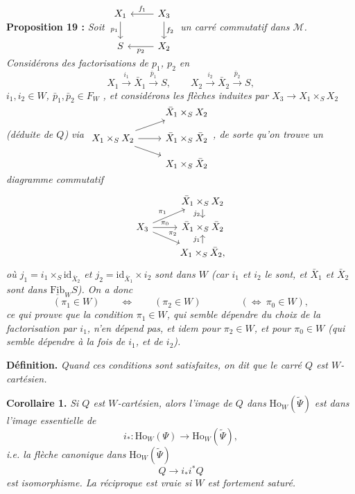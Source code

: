 \documentclass[11pt]{article}
\newcommand{\printedpage}[1]{\marginpar{\footnotesize p.~#1}}
\newcommand{\msp}[1]{\marginpar{\footnotesize [#1]}}
\newcommand{\Ho}{\mathrm{Ho}}
\begin{document}
\textbf{Proposition 19 :} \textit{Soit $\begin{tikzcd}[ampersand replacement=\&] X_1 \arrow[d, "p_1"'] \& X_3 \arrow[l, "f_1"'] \arrow[d, "f_2"] \\ S \& X_2 \arrow[l, "p_2"] \end{tikzcd}$ un carré commutatif dans $\mathcal{M}$. Considérons des factorisations de $p_1$, $p_2$ en}
\[
X_1\xrightarrow{\ i_1\ }\bar{X}_1\xrightarrow{\ \bar{p}_1\ }S,\qquad X_2\xrightarrow{\ i_2\ }\bar{X}_2\xrightarrow{\ \bar{p}_2\ }S,
\]
\textit{$i_1,i_2\in W$, $\bar{p}_1,\bar{p}_2\in F_W$} \textit{, et considérons les flèches induites par $X_3\longrightarrow X_1\times_S X_2$ (déduite de $Q$) via $\begin{tikzcd}[ampersand replacement=\&, row sep=small] \& \bar{X}_1\times_S X_2 \\ X_1\times_S X_2 \arrow[ur] \arrow[r] \arrow[dr] \& \bar{X}_1\times_S\bar{X}_2 \\ \& X_1\times_S\bar{X}_2 \end{tikzcd}$, de sorte qu'on trouve un diagramme commutatif}
\[
\begin{tikzcd}[ampersand replacement=\&, row sep=small]
\& \bar{X}_1\times_S X_2 \arrow[d, "j_2"'] \\
X_3 \arrow[ur, "\pi_1"] \arrow[r, "\pi_0"] \arrow[dr, "\pi_2"] \& \bar{X}_1\times_S\bar{X}_2 \\
\& X_1\times_S\bar{X}_2, \arrow[u, "j_1"]
\end{tikzcd}
\]
\textit{où $j_1=i_1\times_S\mathrm{id}_{\bar{X}_2}$ et $j_2=\mathrm{id}_{\bar{X}_1}\times i_2$ sont dans $W$ (car $i_1$ et $i_2$ le sont, et $\bar{X}_1$ et $\bar{X}_2$ sont dans $\underline{\mathrm{Fib}}_W S$). On a donc}
\[
(\pi_1\in W)\qquad\iff\qquad(\pi_2\in W)\qquad\qquad(\iff\ \pi_0\in W),
\]
\textit{ce qui prouve que la condition $\pi_1\in W$, qui semble dépendre du choix de la factorisation par $i_1$, n'en dépend pas, et idem pour $\pi_2\in W$, et pour $\pi_0\in W$ (qui semble dépendre à la fois de $i_1$, et de $i_2$).}

\printedpage{168}

\msp{page 259}
\textbf{Définition.} \textit{Quand ces conditions sont satisfaites, on dit que le carré $Q$ est $W$-cartésien.}

\textbf{Corollaire 1.} \textit{Si $Q$ est $W$-cartésien, alors l'image de $Q$ dans} $\Ho_W(\tilde{\Psi})$ \textit{est dans l'image essentielle de}
\[
i_* : \Ho_W(\Psi)\longrightarrow\Ho_W(\tilde{\Psi}),
\]
\textit{i.e. la flèche canonique dans} $\Ho_W(\tilde{\Psi})$
\[
Q\longrightarrow i_*i^*Q
\]
\textit{est} \textit{isomorphisme. La réciproque est vraie si $W$ est fortement saturé.}
\end{document}
